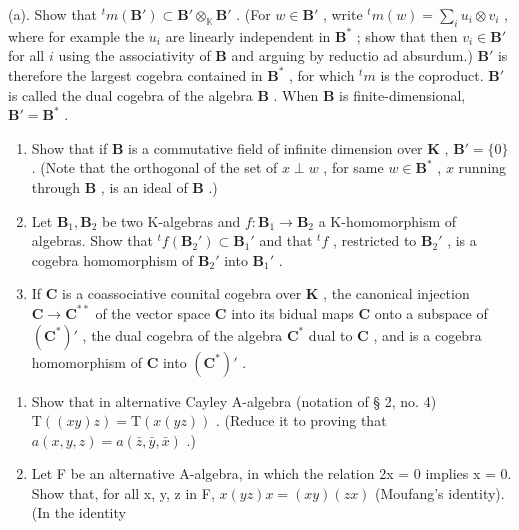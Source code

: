 (a). Show that \({}^t m(\mathbf{B}') \subset \mathbf{B}' \otimes_{\mathbb{K}} \mathbf{B}'\) . (For \(w \in \mathbf{B}'\) , write \({}^t m(w) = \sum_i u_i \otimes v_i\) , where for example the \(u_i\) are linearly independent in \(\mathbf{B}^*\) ; show that then \(v_i \in \mathbf{B}'\) for all \(i\) using the associativity of \(\mathbf{B}\) and arguing by reductio ad absurdum.) \(\mathbf{B}'\) is therefore the largest cogebra contained in \(\mathbf{B}^*\) , for which \({}^t m\) is the coproduct. \(\mathbf{B}'\) is called the dual cogebra of the algebra \(\mathbf{B}\) . When \(\mathbf{B}\) is finite-dimensional, \(\mathbf{B}' = \mathbf{B}^*\) .

\begin{enumerate}
\def\labelenumi{(\alph{enumi})}
\setcounter{enumi}{2}
\item
  Show that if \(\mathbf{B}\) is a commutative field of infinite dimension over \(\mathbf{K}\) , \(\mathbf{B}' = \{0\}\) . (Note that the orthogonal of the set of \(x \perp w\) , for same \(w \in \mathbf{B}^*\) , \(x\) running through \(\mathbf{B}\) , is an ideal of \(\mathbf{B}\) .)
\item
  Let \(\mathbf{B}_1, \mathbf{B}_2\) be two K-algebras and \(f: \mathbf{B}_1 \to \mathbf{B}_2\) a K-homomorphism of algebras. Show that \(^t f(\mathbf{B}_2') \subset \mathbf{B}_1'\) and that \(^t f\) , restricted to \(\mathbf{B}_2'\) , is a cogebra homomorphism of \(\mathbf{B}_2'\) into \(\mathbf{B}_1'\) .
\item
  If \(\mathbf{C}\) is a coassociative counital cogebra over \(\mathbf{K}\) , the canonical injection \(\mathbf{C} \to \mathbf{C}^{**}\) of the vector space \(\mathbf{C}\) into its bidual maps \(\mathbf{C}\) onto a subspace of \((\mathbf{C}^*)'\) , the dual cogebra of the algebra \(\mathbf{C}^*\) dual to \(\mathbf{C}\) , and is a cogebra homomorphism of \(\mathbf{C}\) into \((\mathbf{C}^*)'\) .
\end{enumerate}

\BourbakiAppendixExercises

\begin{enumerate}
\def\labelenumi{\arabic{enumi}.}
\item
  Show that in alternative Cayley A-algebra (notation of § 2, no. 4) \(\mathrm{T}((xy)z) = \mathrm{T}(x(yz))\) . (Reduce it to proving that \(a(x,y,z) = a(\bar{z},\bar{y},\bar{x})\) .)
\item
  Let F be an alternative A-algebra, in which the relation 2x = 0 implies x = 0. Show that, for all x, y, z in F, \(x(yz)x = (xy)(zx)\) (Moufang's identity). (In the identity
\end{enumerate}

